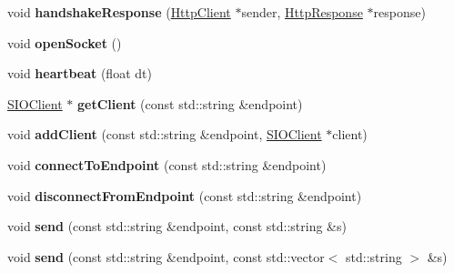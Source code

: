 \begin{DoxyCompactItemize}
void {\bfseries handshake\+Response} (\hyperlink{classnetwork_1_1HttpClient}{Http\+Client} $\ast$sender, \hyperlink{classnetwork_1_1HttpResponse}{Http\+Response} $\ast$response)
\item 
\mbox{\label{classnetwork_1_1SIOClientImpl_a47fefbb644764f194b796f4c23fed7be}} 
void {\bfseries open\+Socket} ()
\item 
\mbox{\label{classnetwork_1_1SIOClientImpl_af5bf5027b80e040648b8db221c7ae739}} 
void {\bfseries heartbeat} (float dt)
\item 
\mbox{\label{classnetwork_1_1SIOClientImpl_a5a02193ec10c1e14e576cc205e96f859}} 
\hyperlink{classnetwork_1_1SIOClient}{S\+I\+O\+Client} $\ast$ {\bfseries get\+Client} (const std\+::string \&endpoint)
\item 
\mbox{\label{classnetwork_1_1SIOClientImpl_a50ea877f490dece3f0a31e1ec47025b2}} 
void {\bfseries add\+Client} (const std\+::string \&endpoint, \hyperlink{classnetwork_1_1SIOClient}{S\+I\+O\+Client} $\ast$client)
\item 
\mbox{\label{classnetwork_1_1SIOClientImpl_af11714fef5c093b3adbfcf12f88d6ea0}} 
void {\bfseries connect\+To\+Endpoint} (const std\+::string \&endpoint)
\item 
\mbox{\label{classnetwork_1_1SIOClientImpl_ab03d285b0ff9ccc84da731832fadb0b3}} 
void {\bfseries disconnect\+From\+Endpoint} (const std\+::string \&endpoint)
\item 
\mbox{\label{classnetwork_1_1SIOClientImpl_aa86efa7432a42df79cd6c9664349875c}} 
void {\bfseries send} (const std\+::string \&endpoint, const std\+::string \&s)
\item 
\mbox{\label{classnetwork_1_1SIOClientImpl_a8cd9064464e70cabd69a81795eb2c24d}} 
void {\bfseries send} (const std\+::string \&endpoint, const std\+::vector$<$ std\+::string $>$ \&s)
\item 
\mbox{\label{classnetwork_1_1SIOClientImpl_a7b89123266553af721b63e1e1515e95c}} 

\end{DoxyCompactItemize}
